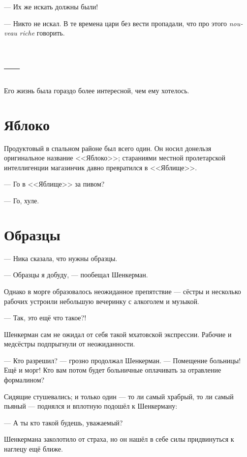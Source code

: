 \documentclass[a4paper,10pt,fleqn]{book}\usepackage{polyglossia}\setdefaultlanguage{english}\setotherlanguage{russian}\defaultfontfeatures{Ligatures=TeX,Mapping=tex-text} \usepackage{xcolor}\definecolor{lightgray}{HTML}{bbbbbb}\color{lightgray}\newcommand{\ml}[3]{\textcolor{black}{#3}}
\newcommand{\textspace}{\vspace{1em}{\centering\Large\bfseries<...>\par}\vspace{1em}}
\begin{document}
--- Их же искать должны были!

--- Никто не искал.
В те времена цари без вести пропадали, что про этого \textit{nouveau riche} говорить.

\section{---}

Его жизнь была гораздо более интересной, чем ему хотелось.

\section{Яблоко}

Продуктовый в спальном районе был всего один.
Он носил донельзя оригинальное название <<Яблоко>>;
стараниями местной пролетарской интеллигенции магазинчик давно превратился в <<Яблище>>.

--- Го в <<Яблище>> за пивом?

--- Го, хуле.

\section{Образцы}

--- Ника сказала, что нужны образцы.

--- Образцы я добуду, --- пообещал Шенкерман.

\textspace

Однако в морге образовалось неожиданное препятствие --- сёстры и несколько рабочих устроили небольшую вечеринку с алкоголем и музыкой.

--- Так, это ещё что такое?!

Шенкерман сам не ожидал от себя такой мхатовской экспрессии.
Рабочие и медсёстры подпрыгнули от неожиданности.

--- Кто разрешил? --- грозно продолжал Шенкерман.
--- Помещение больницы!
Ещё и морг!
Кто вам потом будет больничные оплачивать за отравление формалином?

Сидящие стушевались;
и только один --- то ли самый храбрый, то ли самый пьяный --- поднялся и вплотную подошёл к Шенкерману:

--- А ты кто такой будешь, уважаемый?

Шенкермана заколотило от страха, но он нашёл в себе силы придвинуться к наглецу ещё ближе.
\end{document}
